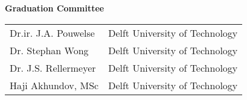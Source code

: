 \noindent \textbf{Graduation Committee}\\
\begin{tabular}{ll}
  Dr.ir. J.A. Pouwelse & Delft University of Technology \\
  Dr. Stephan Wong & Delft University of Technology \\
  Dr. J.S. Rellermeyer & Delft University of Technology \\
  Haji Akhundov, MSc & Delft University of Technology \\

\end{tabular}


\begin{abstract} %
\reportAbstract
\end{abstract}

\clearpage

